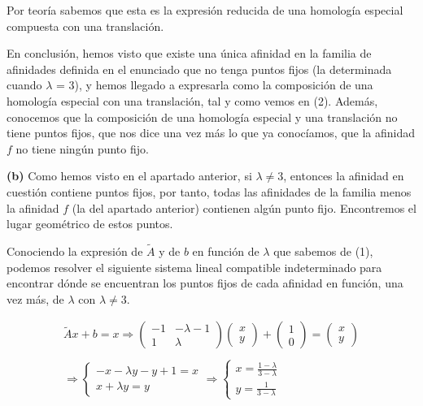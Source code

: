 Por teoría sabemos que esta es la expresión reducida de una homología especial compuesta con una translación. 

En conclusión, hemos visto que existe una única afinidad en la familia de afinidades definida en el enunciado que no tenga puntos fijos (la determinada cuando $\lambda$ = 3), y hemos llegado a expresarla como la composición de una homología especial con una translación, tal y como vemos en (2). Además, conocemos que la composición de una homología especial y una translación no tiene puntos fijos, que nos dice una vez más lo que ya conocíamos, que la afinidad $f$ no tiene ningún punto fijo.

\pagebreak

\textbf{(b) } Como hemos visto en el apartado anterior, si $\lambda \neq 3$, entonces la afinidad en cuestión contiene puntos fijos, por tanto, todas las afinidades de la familia menos la afinidad $f$ (la del apartado anterior) contienen algún punto fijo. Encontremos el lugar geométrico de estos puntos.

Conociendo la expresión de $\widetilde{A}$ y de $b$ en función de $\lambda$ que sabemos de (1), podemos resolver el siguiente sistema lineal compatible indeterminado para encontrar dónde se encuentran los puntos fijos de cada afinidad en función, una vez más, de $\lambda$ con $\lambda \neq 3$.

\begin{gather*}
    \widetilde{A}x + b = x \Longrightarrow 
    \begin{pmatrix}
    -1 & -\lambda - 1\\
    1 & \lambda
    \end{pmatrix}
    \begin{pmatrix}
    x\\ y
    \end{pmatrix}
    +
    \begin{pmatrix}
    1\\ 0
    \end{pmatrix}
    = 
    \begin{pmatrix}
    x\\ y
    \end{pmatrix}
    \\
    \\
    \Longrightarrow
    \begin{cases}
    -x -\lambda y - y + 1 = x\\
    x + \lambda y = y
    \end{cases}
    \Longrightarrow
    \begin{cases}
    x = \frac{1 - \lambda}{3 - \lambda}\\
    y = \frac{1}{3 - \lambda}
    \end{cases}
\end{gather*}

